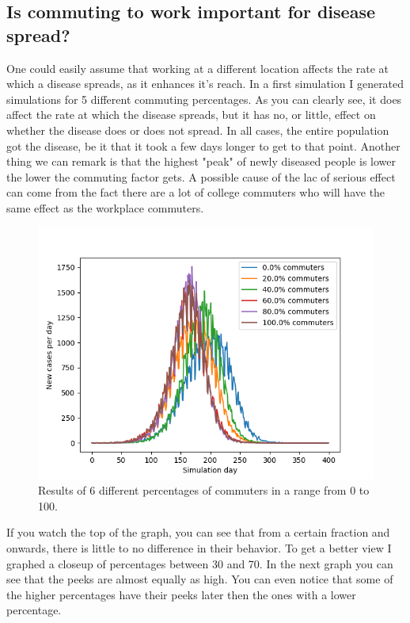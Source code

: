 \documentclass[runningheads]{llncs}
\begin{document}
\subsection{Is commuting to work important for disease spread?}
One could easily assume that working at a different location affects the rate at which a disease spreads, as it enhances it's reach. In a first simulation I generated simulations for 5 different commuting percentages. As you can clearly see, it does affect the rate at which the disease spreads, but it has no, or little, effect on whether the disease does or does not spread. In all cases, the entire population got the disease, be it that it took a few days longer to get to that point. Another thing we can remark is that the highest "peak" of newly diseased people is lower the lower the commuting factor gets. A possible cause of the lac of serious effect can come from the fact there are a lot of college commuters who will have the same effect as the workplace commuters. 
\begin{figure}
	\includegraphics[width=\textwidth]{test_0-100.png}
	\caption{Results of 6 different percentages of commuters in a range from 0 to 100.}
\end{figure}
\newpage
If you watch the top of the graph, you can see that from a certain fraction and onwards, there is little to no difference in their behavior. To get a better view I graphed a closeup of percentages between 30 and 70. In the next graph you can see that the peeks are almost equally as high. You can even notice that some of the higher percentages have their peeks later then the ones with a lower percentage. 
\end{document}

